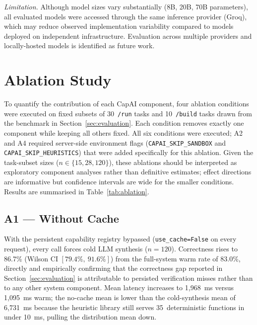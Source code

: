 \documentclass[conference]{IEEEtran}
\begin{document}
\textit{Limitation.} Although model sizes vary substantially (8B, 20B,
70B parameters), all evaluated models were accessed through the same
inference provider (Groq), which may reduce observed implementation
variability compared to models deployed on independent infrastructure.
Evaluation across multiple providers and locally-hosted models is
identified as future work.


\section{Ablation Study}
\label{sec:ablation}

To quantify the contribution of each CapAI component, four ablation
conditions were executed on fixed subsets of 30~\texttt{/run} tasks and
10~\texttt{/build} tasks drawn from the benchmark in
Section~\ref{sec:evaluation}.
Each condition removes exactly one component while keeping all others
fixed.
All six conditions were executed; A2 and A4 required server-side
environment flags (\texttt{CAPAI\_SKIP\_SANDBOX} and
\texttt{CAPAI\_SKIP\_HEURISTICS}) that were added specifically for this
ablation.
Given the task-subset sizes ($n \in \{15, 28, 120\}$), these ablations
should be interpreted as exploratory component analyses rather than
definitive estimates; effect directions are informative but confidence
intervals are wide for the smaller conditions.
Results are summarised in Table~\ref{tab:ablation}.

\subsection{A1 --- Without Cache}

With the persistent capability registry bypassed (\texttt{use\_cache=False}
on every request), every call forces cold LLM synthesis ($n=120$).
Correctness rises to 86.7\% (Wilson CI $[79.4\%,\ 91.6\%]$) from the
full-system warm rate of 83.0\%, directly and empirically confirming that
the correctness gap reported in Section~\ref{sec:evaluation} is
attributable to persisted verification misses rather than to any other
system component.
Mean latency increases to 1{,}968~ms versus 1{,}095~ms warm; the
no-cache mean is lower than the cold-synthesis mean of 6{,}731~ms because
the heuristic library still serves 35~deterministic functions in under
10~ms, pulling the distribution mean down.
\end{document}
